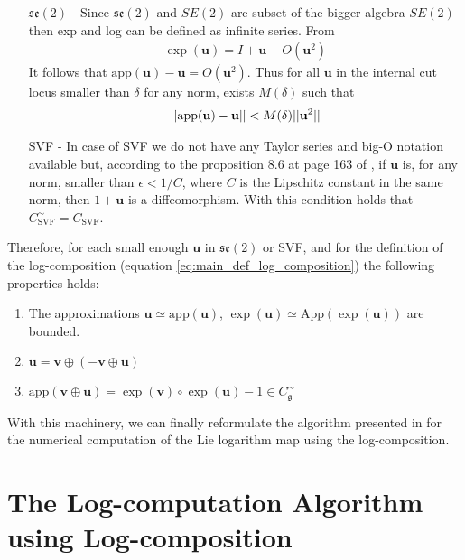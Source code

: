 \begin{enumerate}
	\item[$\mathfrak{se}(2)$ -] Since $\mathfrak{se}(2)$ and $SE(2)$ are subset of the bigger algebra $SE(2)$ then exp and log can be defined as infinite series. From 
	\begin{align*}
	\exp(\mathbf{u}) = I + \mathbf{u} + O(\mathbf{u}^2) 
	\end{align*}
	It follows that $\text{app}(\mathbf{u}) - \mathbf{u} = O(\mathbf{u}^2)$. Thus for all $\mathbf{u}$ in the internal cut locus smaller than $\delta$ for any norm, exists $M(\delta)$ such that
	\begin{align*}
	\vert\lvert \text{app}(\mathbf{u}) - \mathbf{u}  \rvert\vert < M(\delta) \vert\lvert \mathbf{u}^2 \rvert\vert
	\end{align*}
	\item[SVF -] In case of SVF we do not have any Taylor series and big-O notation available but, according to the proposition 8.6 at page 163 of \cite{younes2010shapes}, if $\mathbf{u}$ is, for any norm, smaller than $\epsilon<1/C$, where $C$ is the Lipschitz constant in the same norm, then $1 + \mathbf{u}$ is a diffeomorphism. With this condition holds that
	$C_\text{SVF}^{\sim} = C_\text{SVF}$. 
\end{enumerate}

\noindent
Therefore, for each small enough $\mathbf{u}$ in $\mathfrak{se}(2)$ or SVF, 
and for the definition of the log-composition (equation \ref{eq:main_def_log_composition}) 
the following properties holds:
\begin{enumerate}
	\item The approximations $\mathbf{u} \simeq   \text{app} (\mathbf{u})$, $\exp(\mathbf{u}) \simeq   \text{App} (\exp(\mathbf{u})) $ are bounded.
	\item $\mathbf{u} = \mathbf{v} \oplus (-\mathbf{v} \oplus  \mathbf{u} )$
	\item $\text{app} (\mathbf{v} \oplus  \mathbf{u}) = \exp(\mathbf{v})\circ\exp(\mathbf{u}) - 1 \in C_\mathfrak{g} ^{\sim}$
\end{enumerate}

\noindent
With this machinery, we can finally reformulate the algorithm presented in \cite{Bossa:08} for the numerical computation of the Lie logarithm map using the log-composition.

\section{The Log-computation Algorithm using Log-composition}

